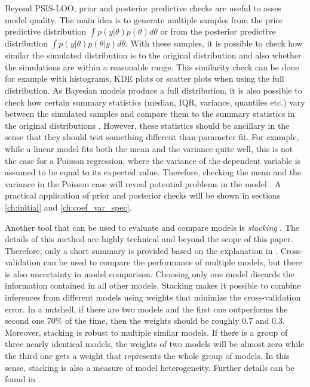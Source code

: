 Beyond PSIS-LOO, prior and posterior predictive checks are useful to asses model quality.
The main idea is to generate multiple samples from the prior predictive distribution $\int  p(y|\theta)p(\theta)d\theta$ or from the posterior predictive distribution $\int p(y | \theta) p(\theta|y) d\theta$.
With these samples, it is possible to check how similar the simulated distribution is to the original distribution and also whether the simulations are within a reasonable range.
This similarity check can be done for example with histograms, KDE plots or scatter plots when using the full distribution.
As Bayesian models produce a full distribution, it is also possible to check how certain summary statistics (median, IQR, variance, quantiles etc.) vary between the simulated samples and compare them to the summary statistics in the original distributions \citep[Chapter 6]{gelman_bayesian_2014}.
However, these statistics should be ancillary in the sense that they should test something different than parameter fit.
For example, while a linear model fits both the mean and the variance quite well, this is not the case for a Poisson regression, where the variance of the dependent variable is assumed to be equal to its expected value.
Therefore, checking the mean and the variance in the Poisson case will reveal potential problems in the model \citep[Chapter 27.3]{stan_development_team_stan_2021}.
A practical application of prior and posterior checks will be shown in sections \ref{ch:initial} and \ref{ch:coef_var_spec}.

Another tool that can be used to evaluate and compare models is \textit{stacking} \citep{yao_using_2018}.
The details of this method are highly technical and beyond the scope of this paper.
Therefore, only a short summary is provided based on the explanation in \cite{gelman_bayesian_2020}.
Cross-validation can be used to compare the performance of multiple models, but there is also uncertainty in model comparison.
Choosing only one model discards the information contained in all other models.
Stacking makes it possible to combine inferences from different models using weights that minimize the cross-validation error.
In a nutshell, if there are two models and the first one outperforms the second one 70\% of the time, then the weights should be roughly 0.7 and 0.3.
Moreover, stacking is robust to multiple similar models.
If there is a group of three nearly identical models, the weights of two models will be almost zero while the third one gets a weight that represents the whole group of models.
In this sense, stacking is also a measure of model heterogeneity.
Further details can be found in \cite{yao_using_2018}.




